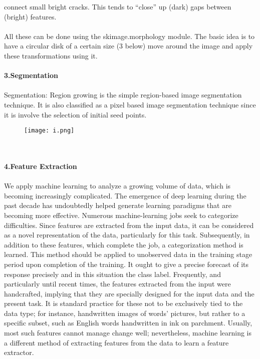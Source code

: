 \documentclass{article}
\begin{document}
connect small bright cracks. This tends to “close” up (dark) gaps between (bright) features.\\\\
All these can be done using the skimage.morphology module. The basic idea is to have a circular disk
of a certain size (3 below) move around the image and apply these transformations using it.\\\\
\newpage
\textbf{3.Segmentation}\\\\
Segmentation: Region growing is the simple region-based image segmentation technique. It is also
classified as a pixel based image segmentation technique since it is involve the selection of initial
seed points.
\begin{figure}[h]
            \centering
            \texttt{[image: i.png]}
        \end{figure}\\\\
        \textbf{4.Feature Extraction}\\\\We apply machine learning to analyze a growing volume of data, which is becoming
increasingly complicated. The emergence of deep learning during the past decade has undoubtedly
helped generate learning paradigms that are becoming more effective. Numerous machine-learning
jobs seek to categorize difficulties. Since features are extracted from the input data, it can be
considered as a novel representation of the data, particularly for this task. Subsequently, in addition
to these features, which complete the job, a categorization method is learned. This method should be
applied to unobserved data in the training stage period upon completion of the training. It ought to
give a precise forecast of its response precisely and in this situation the class label. Frequently, and
particularly until recent times, the features extracted from the input were handcrafted, implying that
they are specially designed for the input data and the present task. It is standard practice for these not
to be exclusively tied to the data type; for instance, handwritten images of words' pictures, but rather
to a specific subset, such as English words handwritten in ink on parchment. Usually, most such
features cannot manage change well; nevertheless, machine learning is a different method of
extracting features from the data to learn a feature extractor.\\\\\ 
\end{document}
